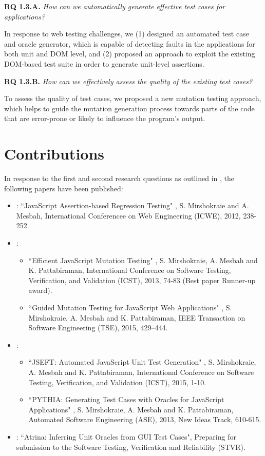 {\bf RQ 1.3.A.} \emph{How can we automatically generate effective test cases for \javascript applications?}

In response to web testing challenges, we (1) designed an automated test case and oracle generator, which is capable of detecting faults
in the \javascript applications for both unit and DOM level, and (2) proposed an approach to exploit the existing DOM-based test suite in order to generate unit-level assertions. 

{\bf RQ 1.3.B.} \emph{How can we effectively assess the quality of the existing \javascript test cases?}

To assess the quality of test cases, we proposed a new \javascript mutation testing approach, which helps to guide the
mutation generation process towards parts of the code that are error-prone or likely to influence the program's output.

\section{Contributions} \label{Sec:contrib}
In response to the first and second research questions as outlined in , the following papers have been published:
\begin{itemize}
\item {}: ``JavaScript Assertion-based Regression Testing" \cite{mirshokraie:icwe12},
S. Mirshokraie and A. Mesbah, International Conferencee on Web Engineering (ICWE), 2012, 238-252.
\item {}:
\begin{itemize}
\item ``Efficient JavaScript Mutation Testing" \cite{mirshokraie:icst13},
S. Mirshokraie, A. Mesbah and K. Pattabiraman, International Conference on Software Testing, Verification, and Validation (ICST), 2013, 74-83 (Best paper Runner-up award).
\item ``Guided Mutation Testing for JavaScript Web Applications" \cite{mirshokraie:tse15},
S. Mirshokraie, A. Mesbah and K. Pattabiraman, IEEE Transaction on Software Engineering (TSE), 2015, 429–444.
\end{itemize}
\item {}:
\begin{itemize}
\item ``JSEFT: Automated JavaScript Unit Test Generation" \cite{mirshokraie:icst15},
S. Mirshokraie, A. Mesbah and K. Pattabiraman, International Conference on Software Testing, Verification, and Validation (ICST), 2015, 1-10.
\item ``PY\-THIA: Generating Test Cases with Oracles
for JavaScript Applications" \cite{shabnam:ase13},
S. Mirshokraie, A. Mesbah and K. Pattabiraman, Automated Software Engineering (ASE), 2013, New Ideas Track, 610-615.
\end{itemize} 
\item {}: ``Atrina: Inferring Unit Oracles from GUI Test Cases", Preparing for submission to the Software Testing, Verification and Reliability (STVR).
\end{itemize}

